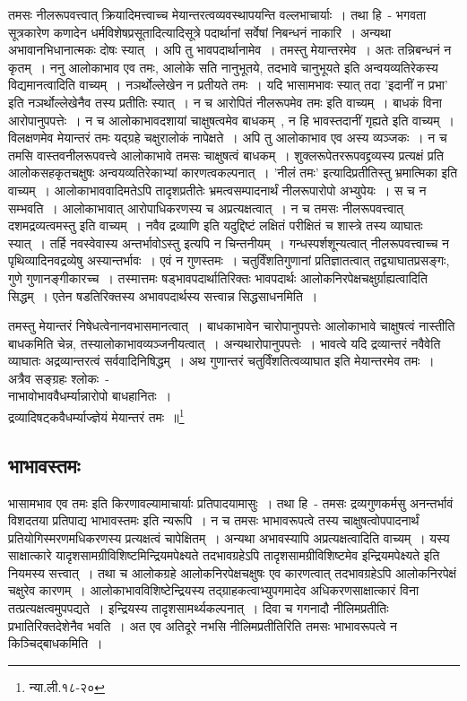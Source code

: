 		तमसः नीलरूपवत्त्वात् क्रियादिमत्त्वाच्च मेयान्तरत्वव्यवस्थापयन्ति वल्लभाचार्याः~। तथा हि~- भगवता सूत्रकारेण कणादेन धर्मविशेषप्रसूतादित्यादिसूत्रे पदार्थानां सर्वेषां निबन्धनं नाकारि~। अन्यथा अभावानभिधानात्मकः दोषः स्यात्~। अपि तु भावपदार्थानामेव~। तमस्तु मेयान्तरमेव~। अतः तन्निबन्धनं न कृतम्~। ननु आलोकाभाव एव तमः, आलोके सति नानुभूतये, तदभावे चानुभूयते इति अन्वयव्यतिरेकस्य विद्यमानत्वादिति वाच्यम्~। नञर्थोल्लेखेन न प्रतीयते तमः~। यदि भासामभावः‌ स्यात् तदा 'इदानीं न प्रभा' इति नञर्थोल्लेखेनैव तस्य प्रतीतिः स्यात्~। न च आरोपितं नीलरूपमेव तमः इति वाच्यम्~। बाधकं विना आरोपानुपपत्तेः~। न च आलोकाभावदशायां चाक्षुषत्वमेव बाधकम्~, न हि भावस्तदानीं गृह्यते  इति वाच्यम्~। विलक्षणमेव मेयान्तरं तमः यद्ग्रहे चक्षुरालोकं नापेक्षते~। अपि तु आलोकाभाव एव अस्य व्यञ्जकः~। न च तमसि वास्तवनीलरूपवत्त्वे आलोकाभावे तमसः चाक्षुषत्वं बाधकम्~। शुक्लरूपेतररूपवद्द्रव्यस्य प्रत्यक्षं प्रति आलोकसहकृतचक्षुषः अन्वयव्यतिरेकाभ्यां कारणत्वकल्पनात्~। 'नीलं तमः' इत्यादिप्रतीतिस्तु भ्रमात्मिका इति वाच्यम्~। आलोकाभाववादिमतेऽपि तादृशप्रतीतेः भ्रमत्वसम्पादनार्थं नीलरूपारोपो अभ्युपेयः~। स च न सम्भवति~। आलोकाभावात् आरोपाधिकरणस्य च अप्रत्यक्षत्वात्~। न च तमसः नीलरूपवत्त्वात् दशमद्रव्यत्वमस्तु इति वाच्यम्~। नवैव द्रव्याणि इति यदुद्दिष्टं लक्षितं परीक्षितं च शास्त्रे तस्य व्याघातः स्यात्~। तर्हि नवस्वेवास्य अन्तर्भावोऽस्तु इत्यपि न चिन्तनीयम्~। गन्धस्पर्शशून्यत्वात् नीलरूपवत्त्वाच्च न पृथिव्यादिनवद्रव्येषु अस्यान्तर्भावः~। एवं न गुणस्तमः~। चतुर्विंशतिगुणानां प्रतिज्ञातत्वात् तद्व्याघातप्रसङ्गः, गुणे गुणानङ्गीकारच्च~। तस्मात्तमः षड्भावपदार्थातिरिक्तः भावपदार्थः आलोकनिरपेक्षचक्षुर्ग्राह्यत्वादिति सिद्धम्~। एतेन षडतिरिक्तस्य अभावपदार्थस्य सत्त्वान्न सिद्धसाधनमिति~।

		{\fontsize{11.7}{0}\selectfont\s तमस्तु मेयान्तरं निषेधत्वेनानवभासमानत्वात्~। बाधकाभावेन चारोपानुपपत्तेः आलोकाभावे चाक्षुषत्वं नास्तीति बाधकमिति चेन्न, तस्यालोकाभावव्यञ्जनीयत्वात्~। अन्यथारोपानुपपत्तेः~। भावत्वे यदि द्रव्यान्तरं नवैवेति व्याघातः अद्रव्यान्तरत्वं सर्ववादिनिषिद्धम्~। अथ गुणान्तरं चतुर्विंशतित्वव्याघात इति मेयान्तरमेव तमः~। अत्रैव सङ्ग्रहः श्लोकः~-\\ नाभावोभाववैधर्म्यान्नारोपो बाधहानितः~।\\ द्रव्यादिषट्कवैधर्म्याज्ज्ञेयं मेयान्तरं तमः~॥\footnote{न्या.ली.१८-२०}}


		\subsection{भाभावस्तमः}

		भासामभाव एव तमः इति किरणावल्यामाचार्याः प्रतिपादयामासुः~। तथा हि~- तमसः द्रव्यगुणकर्मसु अनन्तर्भावं विशदतया प्रतिपाद्य भाभावस्तमः इति न्यरूपि~। न च तमसः भाभावरूपत्वे तस्य चाक्षुषत्वोपपादनार्थं प्रतियोगिस्मरणमधिकरणस्य प्रत्यक्षत्वं चापेक्षितम्~। अन्यथा अभावस्यापि अप्रत्यक्षत्वादिति वाच्यम्~।‌ यस्य साक्षात्कारे यादृशसामग्रीविशिष्टमिन्द्रियमपेक्ष्यते तदभावग्रहेऽपि तादृशसामग्रीविशिष्टमेव इन्द्रियमपेक्ष्यते इति नियमस्य सत्त्वात्~। तथा च आलोकग्रहे आलोकनिरपेक्षचक्षुषः एव कारणत्वात् तदभावग्रहेऽपि आलोकनिरपेक्षं चक्षुरेव कारणम्~। आलोकाभावविशिष्टेन्द्रियस्य तद्ग्राहकत्वाभ्युपगमादेव अधिकरणसाक्षात्कारं विना तत्प्रत्यक्षत्वमुपपद्यते~। इन्द्रियस्य तादृशसामर्थ्यकल्पनात्~। दिवा च गगनादौ नीलिमप्रतीतिः प्रभातिरिक्तदेशेनैव भवति~। अत एव अतिदूरे नभसि नीलिमप्रतीतिरिति तमसः भाभावरूपत्वे न किञ्चिद्बाधकमिति~।

